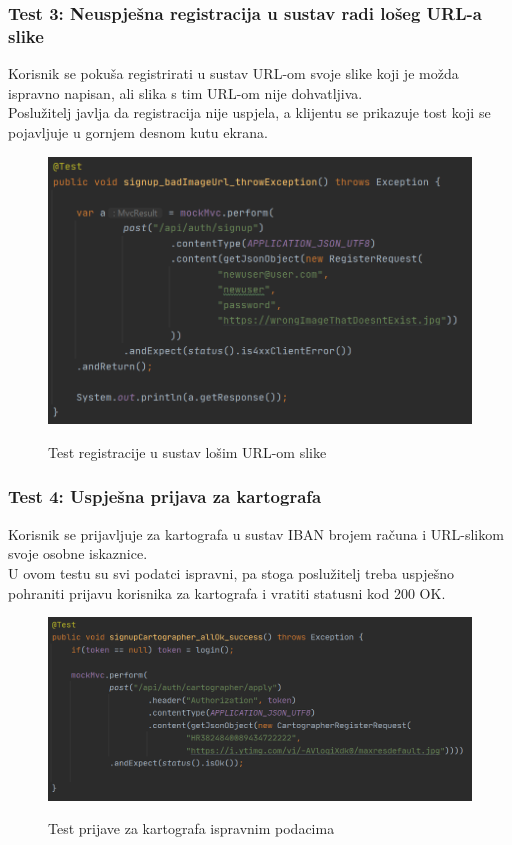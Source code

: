 			\subsubsection{Test 3: Neuspješna registracija u sustav radi lošeg URL-a slike}
			Korisnik se pokuša registrirati u sustav URL-om svoje slike koji je možda ispravno napisan, ali slika s tim URL-om nije dohvatljiva. \\
			Poslužitelj javlja da registracija nije uspjela, a klijentu se prikazuje tost koji se pojavljuje u gornjem desnom kutu ekrana.
			
			\begin{figure}[H]
				\centering
				\includegraphics[scale=0.75]{slike/test3} \\
				\caption{ Test registracije u sustav lošim URL-om slike}
				\label{fig:test3}
			\end{figure}
		
			\subsubsection{Test 4: Uspješna prijava za kartografa}
			Korisnik se prijavljuje za kartografa u sustav IBAN brojem računa i URL-slikom svoje osobne iskaznice. \\
			U ovom testu su svi podatci ispravni, pa stoga poslužitelj treba uspješno pohraniti prijavu korisnika za kartografa i vratiti statusni kod 200 OK.
			
			\begin{figure}[H]
				\centering
				\includegraphics[scale=0.75]{slike/test4} \\
				\caption{ Test prijave za kartografa ispravnim podacima}
				\label{fig:test4}
			\end{figure}
		
